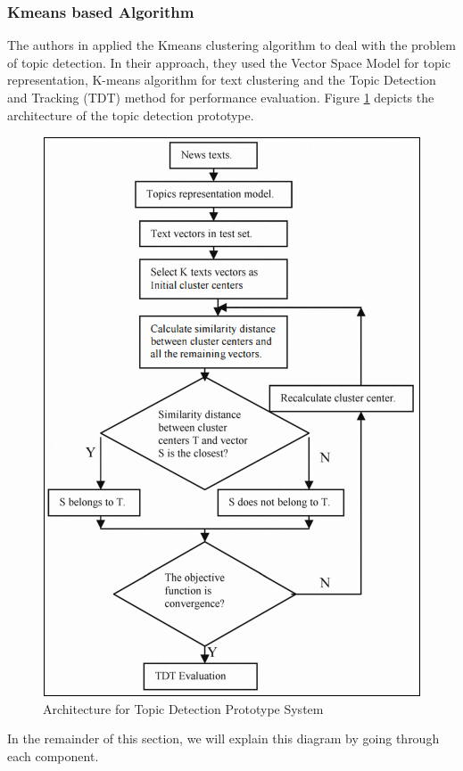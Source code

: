      \subsubsection{Kmeans based Algorithm}
	The authors in \cite{a:kmeans} applied the Kmeans clustering algorithm to deal with the problem of topic detection. In their approach, they used the Vector Space Model for topic representation, K-means algorithm for text clustering and the Topic Detection and Tracking (TDT) method for performance evaluation. Figure \ref{proto} depicts the architecture of the topic detection prototype.
	\begin{figure}[h]
	  \centering
	  \includegraphics[scale=0.7]{graphics/proto.png} 
	  \caption{Architecture for Topic Detection Prototype System}
	  \label{proto}
	\end{figure}
In the remainder of this section, we will explain this diagram  by going through each component.
